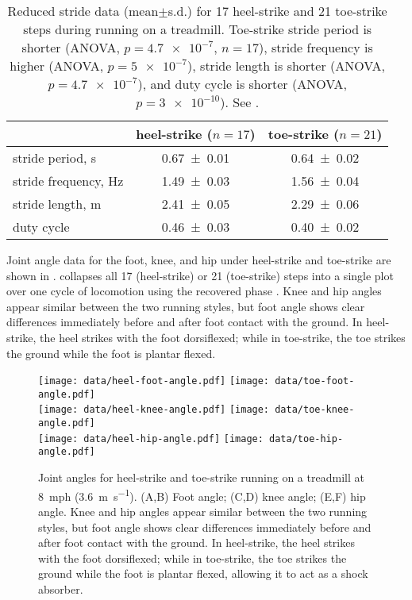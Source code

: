 \begin{table}[h]
\caption{Reduced stride data (mean$\pm$s.d.) for 17 heel-strike and 21 toe-strike steps during running on a treadmill. Toe-strike stride period is shorter (ANOVA, $p=\num{4.7e-7}$, $n=17$), stride frequency is higher (ANOVA, $p=\num{5e-7}$), stride length is shorter (ANOVA, $p=\num{4.7e-7}$), and duty cycle is shorter (ANOVA, $p=\num{3e-10}$). See .}
\label{tab:results:stride}
\begin{center}
\begin{tabular}{lcc}
\toprule
& heel-strike ($n=17$) & toe-strike ($n=21$)\\
\midrule 
stride period, \si{\second}   & \num{0.67\pm0.01} & \num{0.64\pm0.02} \\
stride frequency, \si{\hertz} & \num{1.49\pm0.03} & \num{1.56\pm0.04} \\
stride length, \si{\meter}    & \num{2.41\pm0.05} & \num{2.29\pm0.06} \\
duty cycle                    & \num{0.46\pm0.03} & \num{0.40\pm0.02} \\
\bottomrule
\end{tabular}
\end{center}
\end{table}

Joint angle data for the foot, knee, and hip under heel-strike and toe-strike are shown in .  collapses all 17 (heel-strike) or 21 (toe-strike) steps into a single plot over one cycle of locomotion using the recovered phase \citep{revzen2008estimating}. Knee and hip angles appear similar between the two running styles, but foot angle shows clear differences immediately before and after foot contact with the ground. In heel-strike, the heel strikes with the foot dorsiflexed; while in toe-strike, the toe strikes the ground while the foot is plantar flexed.
\begin{figure}
\begin{center}
\texttt{[image: data/heel-foot-angle.pdf]}
\texttt{[image: data/toe-foot-angle.pdf]}\\
\texttt{[image: data/heel-knee-angle.pdf]}
\texttt{[image: data/toe-knee-angle.pdf]}\\
\texttt{[image: data/heel-hip-angle.pdf]}
\texttt{[image: data/toe-hip-angle.pdf]}
\end{center}
\caption{Joint angles for heel-strike and toe-strike running on a treadmill at \SI{8}{mph} (\SI{3.6}{\meter\per\second}). (A,B) Foot angle; (C,D) knee angle; (E,F) hip angle. Knee and hip angles appear similar between the two running styles, but foot angle shows clear differences immediately before and after foot contact with the ground. In heel-strike, the heel strikes with the foot dorsiflexed; while in toe-strike, the toe strikes the ground while the foot is plantar flexed, allowing it to act as a shock absorber.}
\label{fig:results:jointangles}
\end{figure}

